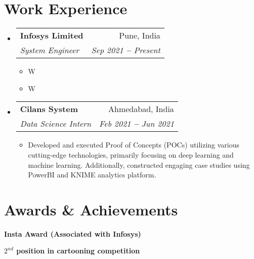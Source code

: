 \documentclass[letterpaper,11pt]{article}
\makeatletter
\newcommand{\resumeItem}[1]{
  \item\small{
    {#1 \vspace{-2pt}}
  }
}
\newcommand{\resumeSubheading}[4]{
  \vspace{-2pt}\item
    \begin{tabular*}{0.97\textwidth}[t]{l@{\extracolsep{\fill}}r}
      \textbf{#1} & #2 \\
      \textit{\small#3} & \textit{\small #4} \\
    \end{tabular*}\vspace{-7pt}
}
\newcommand{\resumeSubHeadingListStart}{\begin{itemize}[leftmargin=0.15in, label={}]}
\newcommand{\resumeSubHeadingListEnd}{\end{itemize}}
\newcommand{\resumeItemListStart}{\begin{itemize}}
\newcommand{\resumeItemListEnd}{\end{itemize}\vspace{-5pt}}
\makeatother
\begin{document}

\section{Work Experience}
  \vspace{3pt}
  \resumeSubHeadingListStart
    
    \resumeSubheading
      {Infosys Limited \href{https://www.infosys.com/}{\raisebox{-0.1\height}\faExternalLink }}{Pune, India}
      {System Engineer}{Sep 2021 \textbf{--} Present }
        \resumeItemListStart
            \resumeItem{W}
            \resumeItem{W}            
        \resumeItemListEnd

    \resumeSubheading
      {Cilans System \href{https://www.cilans.net/}{\raisebox{-0.1\height}\faExternalLink }}{Ahmedabad, India}
      {Data Science Intern}{Feb 2021 \textbf{--} Jun 2021}
        \resumeItemListStart
            \resumeItem{Developed and executed Proof of Concepts (POCs) utilizing various cutting-edge technologies, primarily focusing on deep learning and machine learning. Additionally, constructed engaging case studies using PowerBI and KNIME analytics platform. }
        \resumeItemListEnd
    
  \resumeSubHeadingListEnd




\section{Awards \& Achievements}
  \vspace{2pt}
  \resumeSubHeadingListStart
    \small{\item{
        \textbf{Insta Award (Associated with Infosys) \href{https://www.credly.com/badges/95150e89-26aa-4e4c-897d-bcd3484ffcfa/public_url}{\raisebox{-0.1\height}\faExternalLink }} \\ \vspace{3pt}
        
        \textbf{$2^{nd}$ position in cartooning competition \href{https://www.credly.com/badges/95150e89-26aa-4e4c-897d-bcd3484ffcfa/public_url}{\raisebox{-0.1\height}\faExternalLink }} \\ \vspace{3pt}
    }}
  \resumeSubHeadingListEnd
\end{document}
